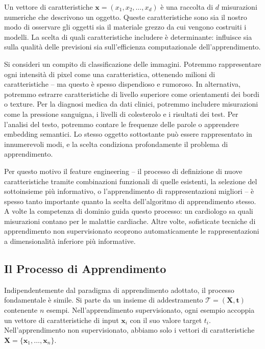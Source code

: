 Un \alert{vettore di caratteristiche} $\mathbf{x} = (x_1, x_2, \ldots, x_d)$ è una raccolta di $d$ misurazioni numeriche che descrivono un oggetto. Queste caratteristiche sono sia il nostro modo di osservare gli oggetti sia il materiale grezzo da cui vengono costruiti i modelli. La scelta di quali caratteristiche includere è determinante: influisce sia sulla qualità delle previsioni sia sull'efficienza computazionale dell'apprendimento.

Si consideri un compito di classificazione delle immagini. Potremmo rappresentare ogni intensità di pixel come una caratteristica, ottenendo milioni di caratteristiche -- ma questo è spesso dispendioso e rumoroso. In alternativa, potremmo estrarre caratteristiche di livello superiore come orientamenti dei bordi o texture. Per la diagnosi medica da dati clinici, potremmo includere misurazioni come la pressione sanguigna, i livelli di colesterolo e i risultati dei test. Per l'analisi del testo, potremmo contare le frequenze delle parole o apprendere embedding semantici. Lo stesso oggetto sottostante può essere rappresentato in innumerevoli modi, e la scelta condiziona profondamente il problema di apprendimento.

Per questo motivo il \alert{feature engineering} -- il processo di definizione di nuove caratteristiche tramite combinazioni funzionali di quelle esistenti, la selezione del sottoinsieme più informativo, o l'apprendimento di rappresentazioni migliori -- è spesso tanto importante quanto la scelta dell'algoritmo di apprendimento stesso. A volte la competenza di dominio guida questo processo: un cardiologo sa quali misurazioni contano per le malattie cardiache. Altre volte, sofisticate tecniche di apprendimento non supervisionato scoprono automaticamente le rappresentazioni a dimensionalità inferiore più informative.


\subsection*{Il Processo di Apprendimento}

Indipendentemente dal paradigma di apprendimento adottato, il processo fondamentale è simile. Si parte da un \alert{insieme di addestramento} $\mathcal{T} = (\mathbf{X}, \mathbf{t})$ contenente $n$ esempi. Nell'apprendimento supervisionato, ogni esempio accoppia un vettore di caratteristiche di input $\mathbf{x}_i$ con il suo valore target $t_i$. Nell'apprendimento non supervisionato, abbiamo solo i vettori di caratteristiche $\mathbf{X} = \{\mathbf{x}_1, \ldots, \mathbf{x}_n\}$.

